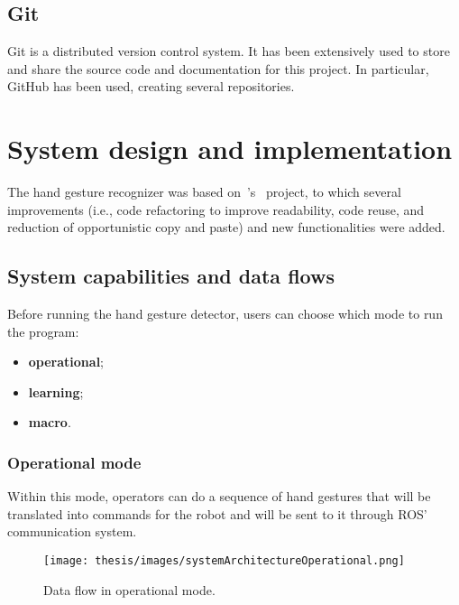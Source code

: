 \documentclass[../thesis.tex]{subfiles}
\begin{document}
\subsection{Git}
Git is a distributed version control system. It has been extensively used to store and share the source code and documentation for this project. In particular, GitHub has been used, creating several repositories.

\section{System design and implementation}\label{sec:system_design_and_implementation}
The hand gesture recognizer was based on~\citeauthor{site:hand_gesture_base_repo}'s~\cite{site:hand_gesture_base_repo} project, to which several improvements (i.e., code refactoring to improve readability, code reuse, and reduction of opportunistic copy and paste) and new functionalities were added.

\subsection{System capabilities and data flows}
Before running the hand gesture detector, users can choose which mode to run the program:
\begin{itemize}
    \item \textbf{operational};
    \item \textbf{learning};
    \item \textbf{macro}.
\end{itemize}

\subsubsection{Operational mode}\label{sss:operational_mode}
Within this mode, operators can do a sequence of hand gestures that will be translated into commands for the robot and will be sent to it through \acrshort{ROS}' communication system.
\begin{figure}[H]
    \centering
    \texttt{[image: thesis/images/systemArchitectureOperational.png]}
    \caption{Data flow in operational mode.}
    \label{fig:system_architecture_operational}
\end{figure}
\end{document}
